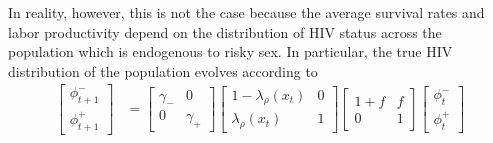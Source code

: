 In reality, however, this is not the case because the average survival rates and labor productivity depend on the distribution of HIV status across the population which is endogenous to risky sex. In particular, the true HIV distribution of the population evolves according to
\begin{align}\label{eq:trueHIVpop}
    \begin{bmatrix}
    \phi^-_{t+1} \\
    \phi^+_{t+1}
    \end{bmatrix}
    & =     
    \begin{bmatrix}%
    \gamma_- &  0 \\
    0 &  \gamma_+
    \end{bmatrix}
    \begin{bmatrix}%
    1-\lambda_\rho(x_t) &  0 \\
    \lambda_\rho(x_t) &  1
    \end{bmatrix}
    \begin{bmatrix}%
    1 + f &  f \\
    0  &  1
    \end{bmatrix}
    \begin{bmatrix}
    \phi_t^- \\
    \phi_t^+
    \end{bmatrix}
    \end{align}
